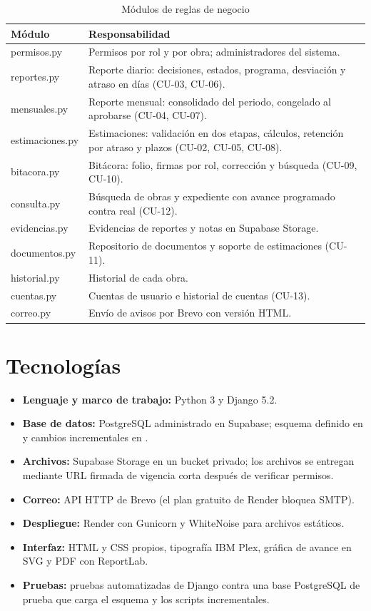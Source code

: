 \begin{table}[h]
\centering\small
\caption{Módulos de reglas de negocio}\label{tab:modulos}
\begin{tabularx}{\linewidth}{@{}>{\ttfamily\small}lX@{}}
\toprule
\normalfont\sffamily\bfseries Módulo & \sffamily\bfseries Responsabilidad\\\midrule
permisos.py & Permisos por rol y por obra; administradores del sistema.\\
reportes.py & Reporte diario: decisiones, estados, programa, desviación y atraso en días (CU-03, CU-06).\\
mensuales.py & Reporte mensual: consolidado del periodo, congelado al aprobarse (CU-04, CU-07).\\
estimaciones.py & Estimaciones: validación en dos etapas, cálculos, retención por atraso y plazos (CU-02, CU-05, CU-08).\\
bitacora.py & Bitácora: folio, firmas por rol, corrección y búsqueda (CU-09, CU-10).\\
consulta.py & Búsqueda de obras y expediente con avance programado contra real (CU-12).\\
evidencias.py & Evidencias de reportes y notas en Supabase Storage.\\
documentos.py & Repositorio de documentos y soporte de estimaciones (CU-11).\\
historial.py & Historial de cada obra.\\
cuentas.py & Cuentas de usuario e historial de cuentas (CU-13).\\
correo.py & Envío de avisos por Brevo con versión HTML.\\
\bottomrule
\end{tabularx}
\end{table}

\section{Tecnologías}
\begin{itemize}
  \item \textbf{Lenguaje y marco de trabajo:} Python 3 y Django 5.2.
  \item \textbf{Base de datos:} PostgreSQL administrado en Supabase; esquema definido en  y cambios incrementales en .
  \item \textbf{Archivos:} Supabase Storage en un bucket privado; los archivos se entregan mediante URL firmada de vigencia corta después de verificar permisos.
  \item \textbf{Correo:} API HTTP de Brevo (el plan gratuito de Render bloquea SMTP).
  \item \textbf{Despliegue:} Render con Gunicorn y WhiteNoise para archivos estáticos.
  \item \textbf{Interfaz:} HTML y CSS propios, tipografía IBM Plex, gráfica de avance en SVG y PDF con ReportLab.
  \item \textbf{Pruebas:} pruebas automatizadas de Django contra una base PostgreSQL de prueba que carga el esquema y los scripts incrementales.
\end{itemize}

